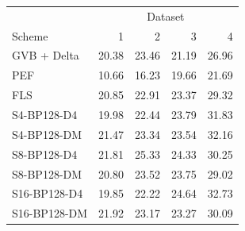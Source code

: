 \begin{tabular}{lrrrr}
\toprule
 & \multicolumn{4}{c}{Dataset} \\
Scheme & 1 & 2 & 3 & 4 \\
\midrule
GVB + Delta & 20.38 & 23.46 & 21.19 & 26.96 \\
PEF & 10.66 & 16.23 & 19.66 & 21.69 \\
FLS & 20.85 & 22.91 & 23.37 & 29.32 \\
S4-BP128-D4 & 19.98 & 22.44 & 23.79 & 31.83 \\
S4-BP128-DM & 21.47 & 23.34 & 23.54 & 32.16 \\
S8-BP128-D4 & 21.81 & 25.33 & 24.33 & 30.25 \\
S8-BP128-DM & 20.80 & 23.52 & 23.75 & 29.02 \\
S16-BP128-D4 & 19.85 & 22.22 & 24.64 & 32.73 \\
S16-BP128-DM & 21.92 & 23.17 & 23.27 & 30.09 \\
\bottomrule
\end{tabular}
